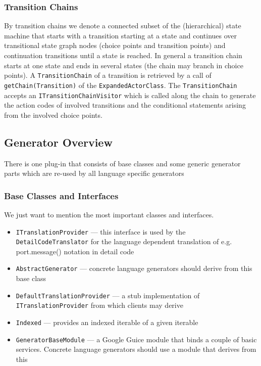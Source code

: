 \subsubsection{Transition Chains}

By transition chains we denote a connected subset of the (hierarchical) state machine that starts with a 
transition starting at a state and continues over transitional state graph nodes (choice points and 
transition points) and continuation transitions until a state is reached. In general a transition chain 
starts at one state and ends in several states (the chain may branch in choice points).
A \texttt{TransitionChain} of a transition is retrieved by a call of \texttt{getChain(Transition)} of the 
\texttt{ExpandedActorClass}.
The \texttt{TransitionChain} accepts an \texttt{ITransitionChainVisitor} which is called along the chain 
to generate the action codes of involved transitions and the conditional statements arising from the 
involved choice points. 

\subsection{Generator Overview}

There is one plug-in that consists of base classes and some generic generator parts which are re-used by 
all language specific generators
 
\subsubsection{Base Classes and Interfaces}

We just want to mention the most important classes and interfaces.

\begin{itemize}
\item \begin{flushleft}\texttt{ITranslationProvider} --- this interface is used by the 
\texttt{DetailCodeTranslator} for the language dependent translation of e.g. port.message() notation in 
detail code\end{flushleft}
\item \texttt{AbstractGenerator} --- concrete language generators should derive from this base class
\item \begin{flushleft}\texttt{DefaultTranslationProvider} --- a stub implementation of 
\texttt{ITranslationProvider} from which clients may derive\end{flushleft}
\item \texttt{Indexed} --- provides an indexed iterable of a given iterable
\item \texttt{GeneratorBaseModule} --- a Google Guice module that binds a couple of basic services. 
Concrete language generators should use a module that derives from this
\end{itemize}

